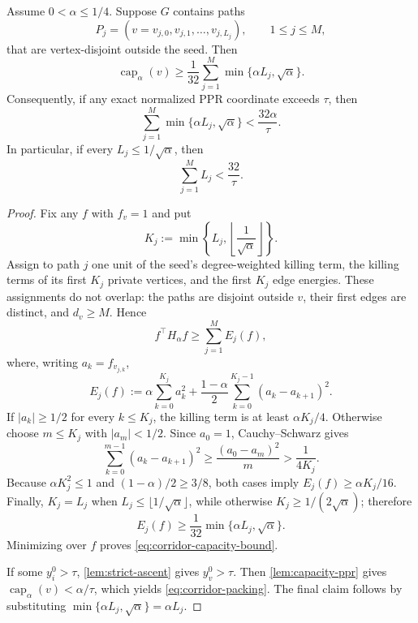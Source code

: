 \begin{theorem}
\label{thm:corridor-capacity}
Assume $0<\alpha\leq1/4$.  Suppose $G$ contains paths
\begin{equation}
 P_j=(v=v_{j,0},v_{j,1},\ldots,v_{j,L_j}),
 \qquad 1\leq j\leq M,
 \label{eq:corridor-paths}
\end{equation}
that are vertex-disjoint outside the seed.  Then
\begin{equation}
 \operatorname{cap}_\alpha(v)
 \geq
 \frac1{32}\sum_{j=1}^M
 \min\{\alpha L_j,\sqrt\alpha\}.
 \label{eq:corridor-capacity-bound}
\end{equation}
Consequently, if any exact normalized PPR coordinate exceeds $\tau$, then
\begin{equation}
 \sum_{j=1}^M\min\{\alpha L_j,\sqrt\alpha\}
 <\frac{32\alpha}{\tau}.
 \label{eq:corridor-packing}
\end{equation}
In particular, if every $L_j\leq1/\sqrt\alpha$, then
\begin{equation}
 \sum_{j=1}^M L_j<\frac{32}{\tau}.
 \label{eq:short-corridor-packing}
\end{equation}
\end{theorem}

\begin{proof}
Fix any $f$ with $f_v=1$ and put
\[
 K_j:=\min\left\{L_j,
                 \left\lfloor\frac1{\sqrt\alpha}\right\rfloor\right\}.
\]
Assign to path $j$ one unit of the seed's degree-weighted killing term, the
killing terms of its first $K_j$ private vertices, and the first $K_j$ edge
energies.  These assignments do not overlap: the paths are disjoint outside
$v$, their first edges are distinct, and $d_v\geq M$.  Hence
\begin{equation}
 f^\top H_\alpha f\geq\sum_{j=1}^M E_j(f),
 \label{eq:path-energy-sum}
\end{equation}
where, writing $a_k=f_{v_{j,k}}$,
\[
 E_j(f):=
 \alpha\sum_{k=0}^{K_j}a_k^2
 +\frac{1-\alpha}{2}
  \sum_{k=0}^{K_j-1}(a_k-a_{k+1})^2.
\]
If $|a_k|\geq1/2$ for every $k\leq K_j$, the killing term is at least
$\alpha K_j/4$.  Otherwise choose $m\leq K_j$ with $|a_m|<1/2$.
Since $a_0=1$, Cauchy--Schwarz gives
\[
 \sum_{k=0}^{m-1}(a_k-a_{k+1})^2
 \geq\frac{(a_0-a_m)^2}{m}
 >\frac1{4K_j}.
\]
Because $\alpha K_j^2\leq1$ and $(1-\alpha)/2\geq3/8$, both cases imply
$E_j(f)\geq\alpha K_j/16$.  Finally,
$K_j=L_j$ when $L_j\leq\lfloor1/\sqrt\alpha\rfloor$, while otherwise
$K_j\geq1/(2\sqrt\alpha)$; therefore
\[
 E_j(f)\geq\frac1{32}
             \min\{\alpha L_j,\sqrt\alpha\}.
\]
Minimizing over $f$ proves \cref{eq:corridor-capacity-bound}.

If some $y_i^0>\tau$, \cref{lem:strict-ascent} gives $y_v^0>\tau$.
Then \cref{lem:capacity-ppr} gives
$\operatorname{cap}_\alpha(v)<\alpha/\tau$, which yields
\cref{eq:corridor-packing}.  The final claim follows by substituting
$\min\{\alpha L_j,\sqrt\alpha\}=\alpha L_j$.
\end{proof}

